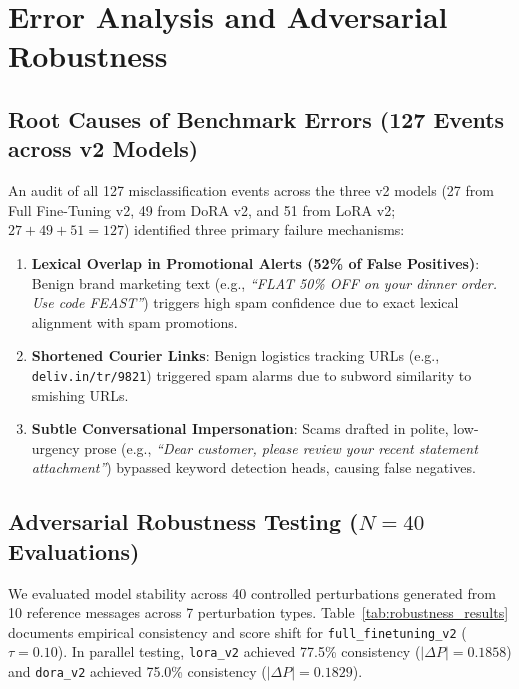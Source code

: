 \documentclass[conference]{IEEEtran}
\begin{document}
\section{Error Analysis and Adversarial Robustness}
\label{sec:error_analysis}

\subsection{Root Causes of Benchmark Errors (127 Events across v2 Models)}
An audit of all 127 misclassification events across the three v2 models (27 from Full Fine-Tuning v2, 49 from DoRA v2, and 51 from LoRA v2; $27+49+51=127$) identified three primary failure mechanisms:
\begin{enumerate}
    \item \textbf{Lexical Overlap in Promotional Alerts (52\% of False Positives)}: Benign brand marketing text (e.g., \textit{``FLAT 50\% OFF on your dinner order. Use code FEAST''}) triggers high spam confidence due to exact lexical alignment with spam promotions.
    \item \textbf{Shortened Courier Links}: Benign logistics tracking URLs (e.g., \texttt{deliv.in/tr/9821}) triggered spam alarms due to subword similarity to smishing URLs.
    \item \textbf{Subtle Conversational Impersonation}: Scams drafted in polite, low-urgency prose (e.g., \textit{``Dear customer, please review your recent statement attachment''}) bypassed keyword detection heads, causing false negatives.
\end{enumerate}

\subsection{Adversarial Robustness Testing ($N=40$ Evaluations)}
We evaluated model stability across 40 controlled perturbations generated from 10 reference messages across 7 perturbation types. Table~\ref{tab:robustness_results} documents empirical consistency and score shift for \texttt{full\_finetuning\_v2} ($\tau=0.10$). In parallel testing, \texttt{lora\_v2} achieved 77.5\% consistency ($|\Delta P| = 0.1858$) and \texttt{dora\_v2} achieved 75.0\% consistency ($|\Delta P| = 0.1829$).
\end{document}
